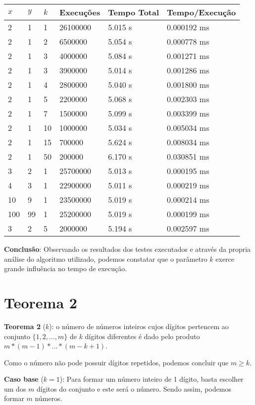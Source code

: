 \documentclass{article}
\begin{document}
\begin{table}[H]
\centering
\begin{tabular}{l|l|l|l|l|l}
$x$ & $y$ & $k$ & Execuções & Tempo Total & Tempo/Execução \\\hline
2 & 1 & 1 & 26100000 & 5.015 s & 0.000192 ms \\
2 & 1 & 2 & 6500000 & 5.054 s & 0.000778 ms \\
2 & 1 & 3 & 4000000 & 5.084 s & 0.001271 ms \\
2 & 1 & 3 & 3900000 & 5.014 s & 0.001286 ms \\
2 & 1 & 4 & 2800000 & 5.040 s & 0.001800 ms \\
2 & 1 & 5 & 2200000 & 5.068 s & 0.002303 ms \\
2 & 1 & 7 & 1500000 & 5.099 s & 0.003399 ms \\
2 & 1 & 10 & 1000000 & 5.034 s & 0.005034 ms \\
2 & 1 & 15 & 700000 & 5.624 s & 0.008034 ms \\
2 & 1 & 50 & 200000 & 6.170 s & 0.030851 ms \\
3 & 2 & 1 & 25700000 & 5.013 s & 0.000195 ms \\
4 & 3 & 1 & 22900000 & 5.011 s & 0.000219 ms \\
10 & 9 & 1 & 23500000 & 5.019 s & 0.000214 ms \\
100 & 99 & 1 & 25200000 & 5.019 s & 0.000199 ms \\
3 & 2 & 5 & 2000000 & 5.194 s & 0.002597 ms


\end{tabular}
\end{table}

\textbf{Conclusão}: Observando os resultados dos testes executados e através da propria análise do algoritmo utilizado, podemos constatar que o parâmetro $k$ exerce grande influência no tempo de execução.

\section{Teorema 2}

\textbf{Teorema 2} ($k$): o número de números inteiros cujos dígitos pertencem ao conjunto $\{1,2,...,m\}$ de $k$ dígitos diferentes é dado pelo produto $m * (m-1) * ... * (m-k+1)$.

Como o número não pode possuir dígitos repetidos, podemos concluir que $m\geq k$.

\textbf{Caso base} ($k = 1$): Para formar um número inteiro de 1 dígito, basta escolher um dos $m$ dígitos do conjunto e este será o número. Sendo assim, podemos formar $m$ números.
\end{document}
